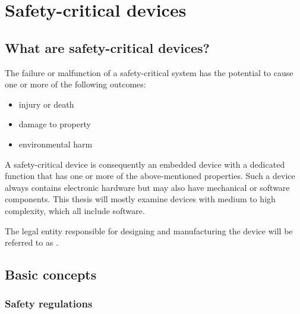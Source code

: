 \section{Safety-critical devices}
\subsection{What are safety-critical devices?}
The failure or malfunction of a safety-critical system has the potential to cause one or more of the following outcomes:
\begin{itemize}
\item injury or death
\item damage to property
\item environmental harm
\end{itemize}
A safety-critical device is consequently an embedded device with a dedicated function that has one or more of the above-mentioned properties. Such a device always contains electronic hardware but may also have mechanical or software components. This thesis will mostly examine devices with medium to high complexity, which all include software.

The legal entity responsible for designing and manufacturing the device will be referred to as \mfg{}.
\subsection{Basic concepts}
\subsubsection{Safety regulations}

